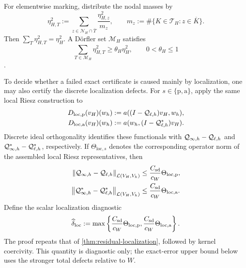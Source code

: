 For elementwise marking, distribute the nodal masses by
\begin{equation}
\label{eq:etaHT}
  \eta_{H,T}^2
  :=\sum_{z\in\mathcal N_H\cap\overline T}
    \frac{\eta_{H,z}^2}{m_z},
  \qquad
  m_z:=\#\{K\in\mathcal T_H:z\in\overline K\}.
\end{equation}
Then $\sum_T\eta_{H,T}^2=\eta_H^2$.  A D\"orfler set
$\mathcal M_H$ satisfies
\begin{equation}
\label{eq:coarse-dorfler}
  \sum_{T\in\mathcal M_H}\eta_{H,T}^2
  \geq\theta_H\eta_H^2,
  \qquad0<\theta_H\leq1
\end{equation}
\cite{Doerfler1996}.

To decide whether a failed exact certificate is caused mainly by
localization, one may also certify the discrete localization defects.  For
$s\in\{\mathrm p,\mathrm a\}$, apply the same local Riesz construction to
\begin{align}
  D_{\mathrm{loc},\mathrm p}(v_H)(w_h)
  &:=a((I-\mathcal Q_{\ell,h})v_H,w_h),
  \label{eq:loc-functional-p}\\
  D_{\mathrm{loc},\mathrm a}(v_H)(w_h)
  &:=a(w_h,(I-\mathcal Q_{\ell,h}^*)v_H).
  \label{eq:loc-functional-a}
\end{align}
Discrete ideal orthogonality identifies these functionals with
$\mathcal Q_{\infty,h}-\mathcal Q_{\ell,h}$ and $\mathcal Q_{\infty,h}^*-\mathcal Q_{\ell,h}^*$, respectively.  If
$\Theta_{\mathrm{loc},s}$ denotes the corresponding operator norm of the
assembled local Riesz representatives, then
\begin{align}
\label{eq:localization-certificate}
  \left\lVert \mathcal Q_{\infty,h}-\mathcal Q_{\ell,h}\right\rVert_{\mathcal L(V_H,V_h)}
  &\leq\frac{C_{\mathrm{sd}}}{c_W}\Theta_{\mathrm{loc},\mathrm p},
  \\
  \left\lVert \mathcal Q_{\infty,h}^*-\mathcal Q_{\ell,h}^*\right\rVert_{\mathcal L(V_H,V_h)}
  &\leq\frac{C_{\mathrm{sd}}}{c_W}\Theta_{\mathrm{loc},\mathrm a}.
\end{align}
Define the scalar localization diagnostic
\begin{equation}
\label{eq:delta-loc-diagnostic}
  \widehat\delta_{\mathrm{loc}}
  :=\max\left\{
      \frac{C_{\mathrm{sd}}}{c_W}\Theta_{\mathrm{loc},\mathrm p},
      \frac{C_{\mathrm{sd}}}{c_W}\Theta_{\mathrm{loc},\mathrm a}
    \right\}.
\end{equation}
The proof repeats that of \cref{thm:residual-localization}, followed by
kernel coercivity.  This quantity is diagnostic only; the exact-error upper
bound below uses the stronger total defects relative to $W$.


